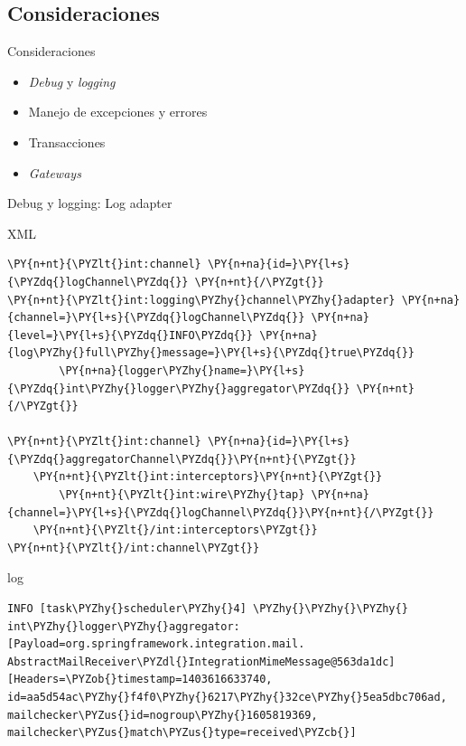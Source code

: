 \documentclass{beamer}
\begin{document}
\subsection{Consideraciones}
\begin{frame}{Consideraciones}
\begin{itemize}
\item \textit{Debug} y \textit{logging}
\item Manejo de excepciones y errores
\item Transacciones
\item \textit{Gateways}
\end{itemize}
\end{frame}

\begin{frame}[fragile]{Debug y logging: Log adapter}

{\small XML}
\begin{Verbatim}[fontsize=\tiny,commandchars=\\\{\}]
\PY{n+nt}{\PYZlt{}int:channel} \PY{n+na}{id=}\PY{l+s}{\PYZdq{}logChannel\PYZdq{}} \PY{n+nt}{/\PYZgt{}}
\PY{n+nt}{\PYZlt{}int:logging\PYZhy{}channel\PYZhy{}adapter} \PY{n+na}{channel=}\PY{l+s}{\PYZdq{}logChannel\PYZdq{}} \PY{n+na}{level=}\PY{l+s}{\PYZdq{}INFO\PYZdq{}} \PY{n+na}{log\PYZhy{}full\PYZhy{}message=}\PY{l+s}{\PYZdq{}true\PYZdq{}} 
        \PY{n+na}{logger\PYZhy{}name=}\PY{l+s}{\PYZdq{}int\PYZhy{}logger\PYZhy{}aggregator\PYZdq{}} \PY{n+nt}{/\PYZgt{}}

\PY{n+nt}{\PYZlt{}int:channel} \PY{n+na}{id=}\PY{l+s}{\PYZdq{}aggregatorChannel\PYZdq{}}\PY{n+nt}{\PYZgt{}}
    \PY{n+nt}{\PYZlt{}int:interceptors}\PY{n+nt}{\PYZgt{}}
        \PY{n+nt}{\PYZlt{}int:wire\PYZhy{}tap} \PY{n+na}{channel=}\PY{l+s}{\PYZdq{}logChannel\PYZdq{}}\PY{n+nt}{/\PYZgt{}}
    \PY{n+nt}{\PYZlt{}/int:interceptors\PYZgt{}}
\PY{n+nt}{\PYZlt{}/int:channel\PYZgt{}}
\end{Verbatim}

{\small log}
\begin{Verbatim}[fontsize=\tiny,commandchars=\\\{\}]
INFO [task\PYZhy{}scheduler\PYZhy{}4] \PYZhy{}\PYZhy{}\PYZhy{} int\PYZhy{}logger\PYZhy{}aggregator: [Payload=org.springframework.integration.mail.
AbstractMailReceiver\PYZdl{}IntegrationMimeMessage@563da1dc][Headers=\PYZob{}timestamp=1403616633740,
id=aa5d54ac\PYZhy{}f4f0\PYZhy{}6217\PYZhy{}32ce\PYZhy{}5ea5dbc706ad, mailchecker\PYZus{}id=nogroup\PYZhy{}1605819369,
mailchecker\PYZus{}match\PYZus{}type=received\PYZcb{}]
\end{Verbatim}
\end{frame}
\end{document}
